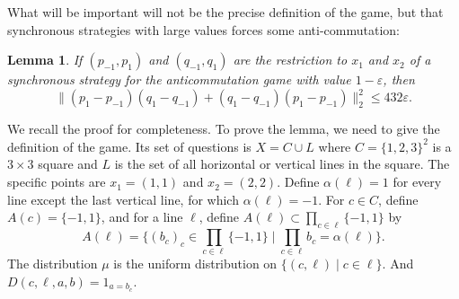 \documentclass[JEP,XML,SOM,Unicode,published]{cedram}
\let\ts\textstyle
\theoremstyle{plain}
\newtheorem{lemma}[theorem]{Lemma}
\theoremstyle{definition}
\begin{document}
What will be important will not be the precise definition of the game, but that synchronous strategies with large values forces some anti-commutation:
\begin{lemma}\cite{MagicSquare}\label{lem:magic-square} If $(p_{-1},p_1)$ and $(q_{-1},q_1)$ are the restriction to $x_1$ and $x_2$ of a synchronous strategy for the anticommutation game with value $1-\varepsilon$, then
\[
\|(p_1-p_{-1})(q_1-q_{-1})+ (q_1-q_{-1})(p_1-p_{-1})\|_2^2 \leq 432 \varepsilon.
\]
\end{lemma}
We recall the proof for completeness. To prove the lemma, we need to give the definition of the game. Its set of questions is $X = C \cup L$ where $C=\{1,2,3\}^2$ is a $3\times 3$ square and $L$ is the set of all horizontal or vertical lines in the square. The specific points are $x_1=(1,1)$ and $x_2 = (2,2)$. Define $\alpha(\ell)=1$ for every line except the last vertical line, for which $\alpha(\ell)=-1$. For $c\in C$, define $A(c) = \{-1,1\}$, and for a line $\ell$, define $A(\ell) \subset \prod_{c \in \ell} \{-1,1\}$ by
\[\ts
A(\ell) = \bigl\{(b_c)_c \in \prod_{c\in \ell} \{-1,1\} \mid \prod_{c\in \ell} b_c=\alpha(\ell)\bigr\}.
\]
The distribution $\mu$ is the uniform distribution on $\{(c,\ell) \mid c \in \ell\}$. And $D(c,\ell,a,b) =1_{a=b_c}$.
\end{document}
